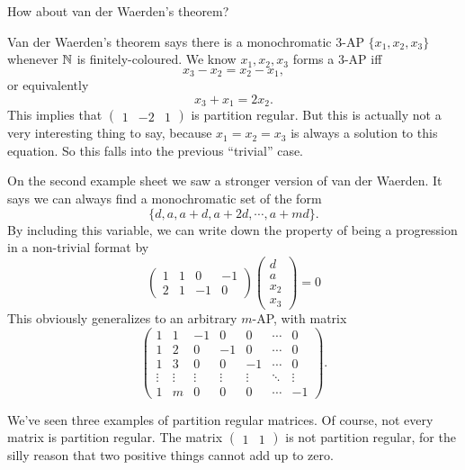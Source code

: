 \documentclass[a4paper]{article}
\begin{document}
How about van der Waerden's theorem?
\begin{eg}
  Van der Waerden's theorem says there is a monochromatic $3$-AP $\{x_1, x_2, x_3\}$ whenever $\mathbb{N}$ is finitely-coloured. We know $x_1, x_2, x_3$ forms a $3$-AP iff
  \[
    x_3 - x_2 = x_2 - x_1,
  \]
  or equivalently
  \[
    x_3 + x_1 = 2 x_2.
  \]
  This implies that $\begin{pmatrix}1 & -2 & 1\end{pmatrix}$ is partition regular. But this is actually not a very interesting thing to say, because $x_1 = x_2 = x_3$ is always a solution to this equation. So this falls into the previous ``trivial'' case.

  On the second example sheet we saw a stronger version of van der Waerden. It says we can always find a monochromatic set of the form
  \[
    \{d, a, a + d, a + 2d, \cdots, a + md\}.
  \]
  By including this variable, we can write down the property of being a progression in a non-trivial format by
  \[
    \begin{pmatrix}
      1 & 1 & 0 & -1\\
      2 & 1 & -1 & 0
    \end{pmatrix}
    \begin{pmatrix}
      d \\ a \\ x_2 \\ x_3
    \end{pmatrix} = 0
  \]
  This obviously generalizes to an arbitrary $m$-AP, with matrix
  \[
    \begin{pmatrix}
      1 & 1 & -1 & 0 & 0 & \cdots & 0\\
      1 & 2 & 0 & -1 & 0 & \cdots & 0\\
      1 & 3 & 0 & 0 & -1 & \cdots & 0\\
      \vdots & \vdots & \vdots & \vdots & \vdots & \ddots & \vdots\\
      1 & m & 0 & 0 & 0 & \cdots & -1
    \end{pmatrix}.
  \]
\end{eg}
We've seen three examples of partition regular matrices. Of course, not every matrix is partition regular. The matrix $\begin{pmatrix}1 & 1\end{pmatrix}$ is not partition regular, for the silly reason that two positive things cannot add up to zero.
\end{document}
